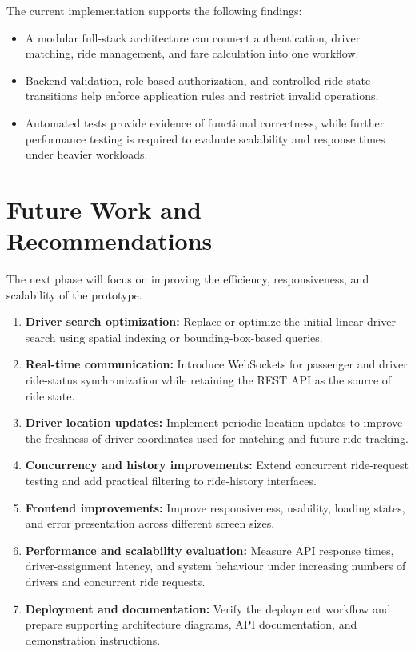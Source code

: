\documentclass{tietreport}
\begin{document}
The current implementation supports the following findings:

\begin{itemize}
    \item A modular full-stack architecture can connect
    authentication, driver matching, ride management,
    and fare calculation into one workflow.

    \item Backend validation, role-based authorization,
    and controlled ride-state transitions help enforce
    application rules and restrict invalid operations.

    \item Automated tests provide evidence of functional
    correctness, while further performance testing is
    required to evaluate scalability and response times
    under heavier workloads.
\end{itemize}

\section{Future Work and Recommendations}

The next phase will focus on improving the efficiency,
responsiveness, and scalability of the prototype.

\begin{enumerate}
    \item \textbf{Driver search optimization:}
    Replace or optimize the initial linear driver search
    using spatial indexing or bounding-box-based queries.

    \item \textbf{Real-time communication:}
    Introduce WebSockets for passenger and driver ride-status
    synchronization while retaining the REST API as the
    source of ride state.

    \item \textbf{Driver location updates:}
    Implement periodic location updates to improve the
    freshness of driver coordinates used for matching
    and future ride tracking.

    \item \textbf{Concurrency and history improvements:}
    Extend concurrent ride-request testing and add practical
    filtering to ride-history interfaces.

    \item \textbf{Frontend improvements:}
    Improve responsiveness, usability, loading states,
    and error presentation across different screen sizes.

    \item \textbf{Performance and scalability evaluation:}
    Measure API response times, driver-assignment latency,
    and system behaviour under increasing numbers of
    drivers and concurrent ride requests.

    \item \textbf{Deployment and documentation:}
    Verify the deployment workflow and prepare supporting
    architecture diagrams, API documentation, and
    demonstration instructions.
\end{enumerate}
\end{document}
